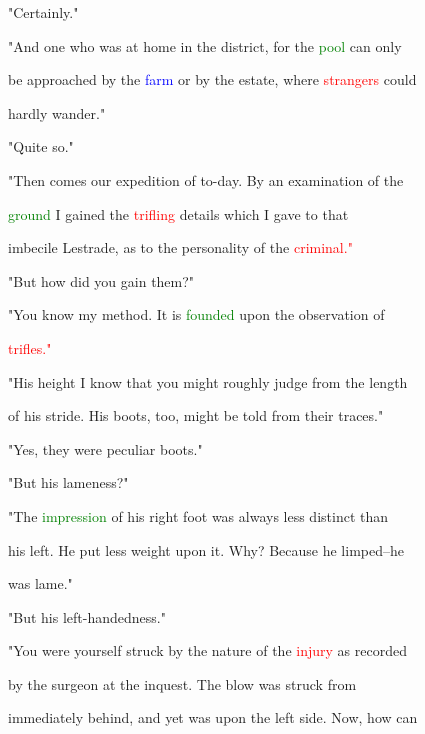  "Certainly."



 "And one who was at home in the district, for the \textcolor{green}{pool} can only

 be approached by the \textcolor{blue}{farm} or by the estate, where \textcolor{red}{strangers} could

 hardly wander."



 "Quite so."



 "Then comes our \textcolor{BurntOrange}{expedition} of to-day. By an \textcolor{BurntOrange}{examination} of the

 \textcolor{green}{ground} I \textcolor{BurntOrange}{gained} the \textcolor{red}{trifling} details which I gave to that

 imbecile Lestrade, as to the personality of the \textcolor{red}{criminal."}



 "But how did you \textcolor{BurntOrange}{gain} them?"



 "You know my method. It is \textcolor{green}{founded} upon the observation of

 \textcolor{red}{trifles."}



 "His height I know that you might roughly judge from the length

 of his stride. His boots, too, might be told from their traces."



 "Yes, they were peculiar boots."



 "But his lameness?"



 "The \textcolor{green}{impression} of his right foot was always less distinct than

 his left. He put less \textcolor{BurntOrange}{weight} upon it. Why? Because he limped--he

 was lame."



 "But his left-handedness."



 "You were yourself struck by the nature of the \textcolor{red}{injury} as recorded

 by the surgeon at the inquest. The blow was struck from

 \textcolor{BurntOrange}{immediately} behind, and yet was upon the left side. Now, how can

